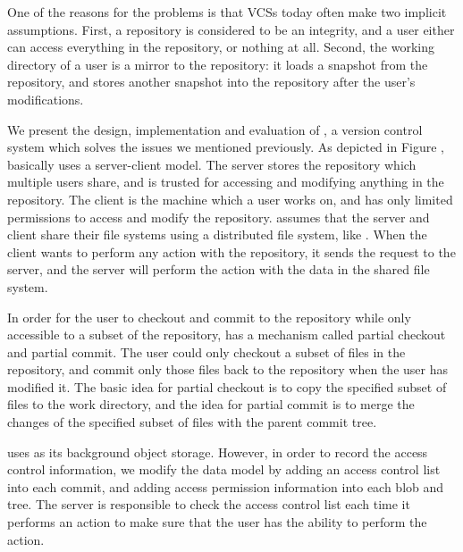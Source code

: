 One of the reasons for the problems is that VCSs today often
make two implicit assumptions. First, a repository is considered to be
an integrity, and a user either can access everything in the repository, or
nothing at all. Second, the working directory of a user is a mirror to the
repository: it loads a snapshot from the repository, and stores another snapshot
into the repository after the user's modifications. 

We present the design, implementation and evaluation of \sys, a version control
system which solves the issues we mentioned previously. As depicted in Figure
, \sys basically
uses a server-client model. The server stores the repository which multiple
users share, and is trusted for accessing and modifying anything in the
repository. The client is the machine which a user works on, and has only
limited permissions to access and modify the repository. \sys assumes that the
server and client share their file systems using a distributed file system, like
\nfs. %
When the client wants to perform any action with the repository, it sends the
request to the server, and the server will perform the action with the data in
the shared file system. 

In order for the user to checkout and commit to the repository while only
accessible to a subset of the repository, \sys has a mechanism called partial
checkout and partial commit. The user could only checkout a subset of files in
the repository, and commit only those files back to the repository when the user
has modified it. The basic idea for partial checkout is to copy the specified
subset of files to the work directory, and the idea for partial commit is to
merge the changes of the specified subset of files with the parent commit tree.

\sys uses \git as its background object storage. However, in order to record the
access control information, we modify the data model by adding an access control
list into each commit, and adding access permission information into each blob
and tree. The server is responsible to check the
access control list each time it performs an action to make sure that the user
has the ability to perform the action.

